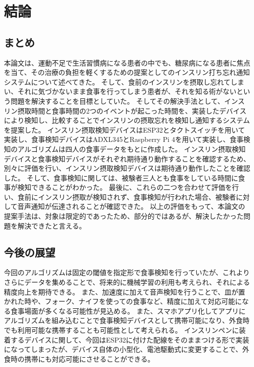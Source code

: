 \chapter{結論}
\label{chap:conclusion}

\section{まとめ}
\label{section:conclusion_sum}

本論文は、運動不足で生活習慣病になる患者の中でも、糖尿病になる患者に焦点を当て、その治療の負担を軽くするための提案としてのインスリン打ち忘れ通知システムについて述べてきた。
そして、食前のインスリンを摂取し忘れてしまい、それに気づかないまま食事を行ってしまう患者が、それを知る術がないという問題を解決することを目標としていた。
そしてその解決手法として、インスリン摂取時間と食事時間の2つのイベントが起こった時間を、実装したデバイスにより検知し、比較することでインスリンの摂取忘れを検知し通知するシステムを提案した。
インスリン摂取検知デバイスはESP32とタクトスイッチを用いて実装し、食事検知デバイスはADXL345とRaspberry Pi 4を用いて実装し、食事検知のアルゴリズムは四人の食事データをもとに作成した。
インスリン摂取検知デバイスと食事検知デバイスがそれぞれ期待通り動作することを確認するため、別々に評価を行い、インスリン摂取検知デバイスは期待通り動作したことを確認した。
そして、食事検知に関しては、被験者三人とも食事をしている時間に食事が検知できることがわかった。
最後に、これらの二つを合わせて評価を行い、食前にインスリン摂取が検知されず、食事検知が行われた場合、被験者に対して音声通知が伝達されることが確認できた。
以上の評価をもって、本論文の提案手法は、対象は限定的であったため、部分的ではあるが、解決したかった問題を解決できたと言える。

\section{今後の展望}

今回のアルゴリズムは固定の閾値を指定形で食事検知を行っていたが、これよりさらにデータを集めることで、将来的に機械学習の利用も考えられ、それによる精度向上を期待できる。
また、加速度に加えて音声検知を行うことで、皿が置かれた時や、フォーク、ナイフを使っての食事など、精度に加えて対応可能になる食事場面が多くなる可能性が見込める。
また、スマホアプリ化してアプリにアルゴリズムを組み込むことで食事検知デバイスとして携帯可能になり、外食時でも利用可能な携帯することも可能性として考えられる。
インスリンペンに装着するデバイスに関して、今回はESP32に付けた配線をそのままつける形で実装になってしまったが、デバイス自体の小型化、電池駆動式に変更することで、外食時の携帯にも対応可能にさせることができる。
